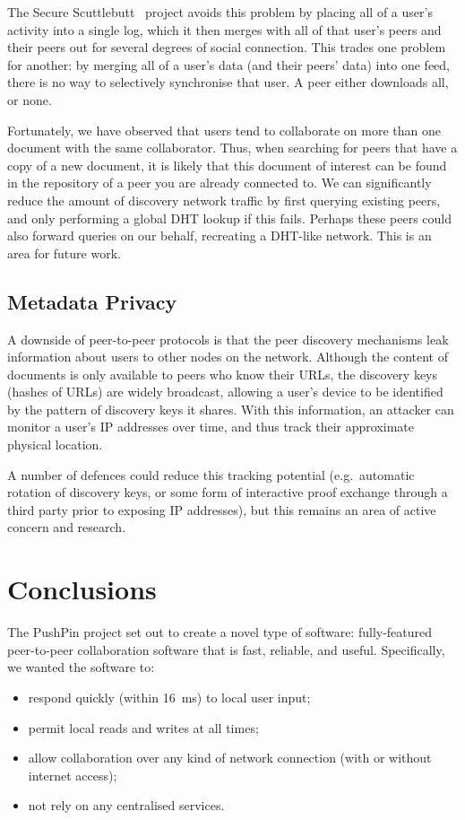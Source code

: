 \documentclass[sigplan,10pt]{acmart}
\begin{document}
The Secure Scuttlebutt~\cite{Tarr:2019ba} project avoids this problem by placing all of a user's activity into a single log, which it then merges with all of that user's peers and their peers out for several degrees of social connection. This trades one problem for another: by merging all of a user's data (and their peers' data) into one feed, there is no way to selectively synchronise that user. A peer either downloads all, or none.

Fortunately, we have observed that users tend to collaborate on more than one document with the same collaborator.
Thus, when searching for peers that have a copy of a new document, it is likely that this document of interest can be found in the repository of a peer you are already connected to.
We can significantly reduce the amount of discovery network traffic by first querying existing peers, and only performing a global DHT lookup if this fails.
Perhaps these peers could also forward queries on our behalf, recreating a DHT-like network.
This is an area for future work.

\subsection{Metadata Privacy}

A downside of peer-to-peer protocols is that the peer discovery mechanisms leak information about users to other nodes on the network.
Although the content of documents is only available to peers who know their URLs, the discovery keys (hashes of URLs) are widely broadcast, allowing a user's device to be identified by the pattern of discovery keys it shares. With this information, an attacker can monitor a user's IP addresses over time, and thus track their approximate physical location.

A number of defences could reduce this tracking potential (e.g.\ automatic rotation of discovery keys, or some form of interactive proof exchange through a third party prior to exposing IP addresses), but this remains an area of active concern and research.

\section{Conclusions}

The PushPin project set out to create a novel type of software: fully-featured peer-to-peer collaboration software that is fast, reliable, and useful. Specifically, we wanted the software to:
\begin{itemize}
    \item respond quickly (within 16~ms) to local user input;
    \item permit local reads and writes at all times;
    \item allow collaboration over any kind of network connection (with or without internet access);
    \item not rely on any centralised services.
\end{itemize}
\end{document}
